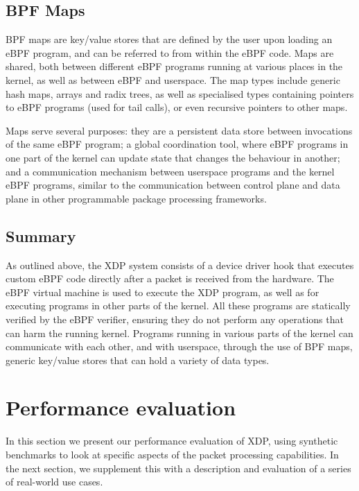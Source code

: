 \documentclass[10pt,sigconf,anonymous]{acmart}
\begin{document}
\subsection{BPF Maps}
\label{sec:bpf-maps}

BPF maps are key/value stores that are defined by the user upon loading an eBPF
program, and can be referred to from within the eBPF code. Maps are shared, both
between different eBPF programs running at various places in the kernel, as well
as between eBPF and userspace. The map types include generic hash maps, arrays
and radix trees, as well as specialised types containing pointers to eBPF
programs (used for tail calls), or even recursive pointers to other maps.

Maps serve several purposes: they are a persistent data store between
invocations of the same eBPF program; a global coordination tool, where eBPF
programs in one part of the kernel can update state that changes the behaviour
in another; and a communication mechanism between userspace programs and the
kernel eBPF programs, similar to the communication between control plane and
data plane in other programmable package processing frameworks.


\subsection{Summary}
\label{sec:design-summary}

As outlined above, the XDP system consists of a device driver hook that executes
custom eBPF code directly after a packet is received from the hardware. The eBPF
virtual machine is used to execute the XDP program, as well as for executing
programs in other parts of the kernel. All these programs are statically
verified by the eBPF verifier, ensuring they do not perform any operations that
can harm the running kernel. Programs running in various parts of the kernel can
communicate with each other, and with userspace, through the use of BPF maps,
generic key/value stores that can hold a variety of data types.

\section{Performance evaluation}
\label{sec:perf-eval}
In this section we present our performance evaluation of XDP, using synthetic
benchmarks to look at specific aspects of the packet processing capabilities. In
the next section, we supplement this with a description and evaluation of a
series of real-world use cases.
\end{document}
